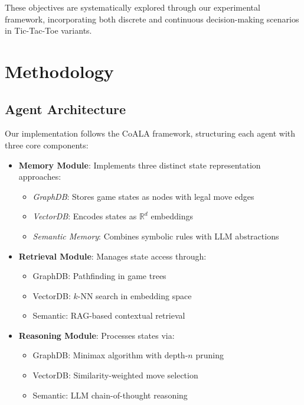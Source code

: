 \documentclass[11pt]{article}
\begin{document}
These objectives are systematically explored through our experimental framework, incorporating both discrete and continuous decision-making scenarios in Tic-Tac-Toe variants.

\section{Methodology}
\subsection{Agent Architecture}
Our implementation follows the CoALA framework, structuring each agent with three core components:

\begin{itemize}
    \item \textbf{Memory Module}: Implements three distinct state representation approaches:
    \begin{itemize}
        \item \textit{GraphDB}: Stores game states as nodes with legal move edges
        \item \textit{VectorDB}: Encodes states as $\mathbb{R}^d$ embeddings
        \item \textit{Semantic Memory}: Combines symbolic rules with LLM abstractions
    \end{itemize}
    
    \item \textbf{Retrieval Module}: Manages state access through:
    \begin{itemize}
        \item GraphDB: Pathfinding in game trees
        \item VectorDB: $k$-NN search in embedding space
        \item Semantic: RAG-based contextual retrieval
    \end{itemize}
    
    \item \textbf{Reasoning Module}: Processes states via:
    \begin{itemize}
        \item GraphDB: Minimax algorithm with depth-$n$ pruning
        \item VectorDB: Similarity-weighted move selection
        \item Semantic: LLM chain-of-thought reasoning
    \end{itemize}
\end{itemize}
\end{document}
